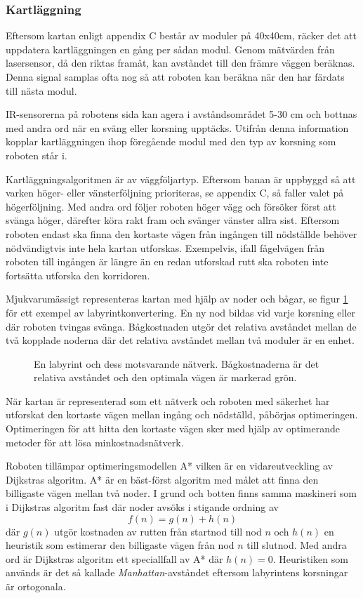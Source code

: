 \documentclass[11pt]{article}
\begin{document}
\begin{flushleft}
\subsubsection{Kartläggning}
Eftersom kartan enligt appendix C består av moduler på 40x40cm, räcker det att uppdatera kartläggningen en gång per sådan modul. Genom mätvärden från lasersensor, då den riktas framåt, kan avståndet till den främre väggen beräknas. Denna signal samplas ofta nog så att roboten kan beräkna när den har färdats till nästa modul. 

IR-sensorerna på robotens sida kan agera i avståndsområdet 5-30 cm och bottnas med andra ord när en sväng eller korsning upptäcks. Utifrån denna information kopplar kartläggningen ihop föregående modul med den typ av korsning som roboten står i. 

Kartläggningsalgoritmen är av väggföljartyp. Eftersom banan är uppbyggd så att varken höger- eller vänsterföljning prioriteras, se appendix C, så faller valet på högerföljning. Med andra ord följer roboten höger vägg och försöker först att svänga höger, därefter köra rakt fram och svänger vänster allra sist. Eftersom roboten endast ska finna den kortaste vägen från ingången till nödställde behöver nödvändigtvis inte hela kartan utforskas. Exempelvis, ifall fågelvägen från roboten till ingången är längre än en redan utforskad rutt ska roboten inte fortsätta utforska den korridoren.

Mjukvarumässigt representeras kartan med hjälp av noder och bågar, se figur \ref{labToGraph} för ett exempel av labyrintkonvertering. En ny nod bildas vid varje korsning eller där roboten tvingas svänga. Bågkostnaden utgör det relativa avståndet mellan de två kopplade noderna där det relativa avståndet mellan två moduler är en enhet.

\begin{figure}[htbp]
\centering
\noindent\resizebox{.6\linewidth}{!}{
	}
	\caption{En labyrint och dess motsvarande nätverk. Bågkostnaderna är det relativa avståndet och den optimala vägen är markerad grön.\label{labToGraph}}	
\end{figure}

När kartan är representerad som ett nätverk och roboten med säkerhet har utforskat den kortaste vägen mellan ingång och nödställd, påbörjas optimeringen. Optimeringen för att hitta den kortaste vägen sker med hjälp av optimerande metoder för att lösa minkostnadsnätverk.

Roboten tillämpar optimeringsmodellen A* vilken är en vidareutveckling av Dijkstras algoritm. A* är en bäst-först algoritm med målet att finna den billigaste vägen mellan två noder. I grund och botten finns samma maskineri som i Dijkstras algoritm fast där noder avsöks i stigande ordning av
\begin{equation*}
	f(n) = g(n) + h(n)
\end{equation*}
där $g(n)$ utgör kostnaden av rutten från startnod till nod $n$ och $h(n)$ en heuristik som estimerar den billigaste vägen från nod $n$ till slutnod. Med andra ord är Dijkstras algoritm ett speciallfall av A* där $h(n) = 0$. Heuristiken som används är det så kallade \emph{Manhattan}-avståndet eftersom labyrintens korsningar är ortogonala.


\end{flushleft}
\end{document}

